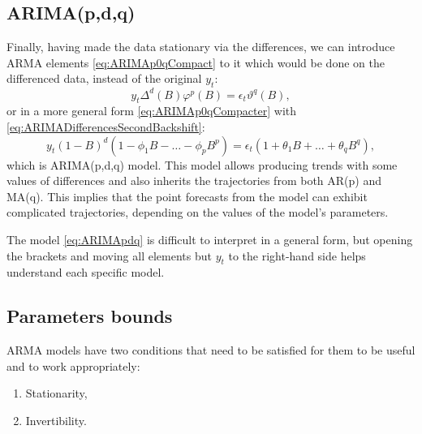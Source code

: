 \documentclass[
]{book}
\providecommand{\tightlist}{%
  \setlength{\itemsep}{0pt}\setlength{\parskip}{0pt}}
\theoremstyle{definition}
\theoremstyle{definition}
\theoremstyle{definition}
\theoremstyle{definition}
\theoremstyle{remark}
\begin{document}
\hypertarget{arimapdq}{%
\subsection{ARIMA(p,d,q)}\label{arimapdq}}

Finally, having made the data stationary via the differences, we can introduce ARMA elements \eqref{eq:ARIMAp0qCompact} to it which would be done on the differenced data, instead of the original \(y_t\):
\begin{equation}
  y_t \Delta^d(B) \varphi^p(B) = \epsilon_t \vartheta^q(B) ,
  \label{eq:ARIMApdqCompact}
\end{equation}
or in a more general form \eqref{eq:ARIMAp0qCompacter} with \eqref{eq:ARIMADifferencesSecondBackshift}:
\begin{equation}
  y_t (1-B)^d (1 -\phi_1 B -\dots -\phi_p B^p) = \epsilon_t (1 + \theta_1 B + \dots + \theta_q B^q),
  \label{eq:ARIMApdq}
\end{equation}
which is ARIMA(p,d,q) model. This model allows producing trends with some values of differences and also inherits the trajectories from both AR(p) and MA(q). This implies that the point forecasts from the model can exhibit complicated trajectories, depending on the values of the model's parameters.

The model \eqref{eq:ARIMApdq} is difficult to interpret in a general form, but opening the brackets and moving all elements but \(y_t\) to the right-hand side helps understand each specific model.

\hypertarget{ARIMABounds}{%
\subsection{Parameters bounds}\label{ARIMABounds}}

ARMA models have two conditions that need to be satisfied for them to be useful and to work appropriately:

\begin{enumerate}
\def\labelenumi{\arabic{enumi}.}
\tightlist
\item
  Stationarity,
\item
  Invertibility.
\end{enumerate}
\end{document}
